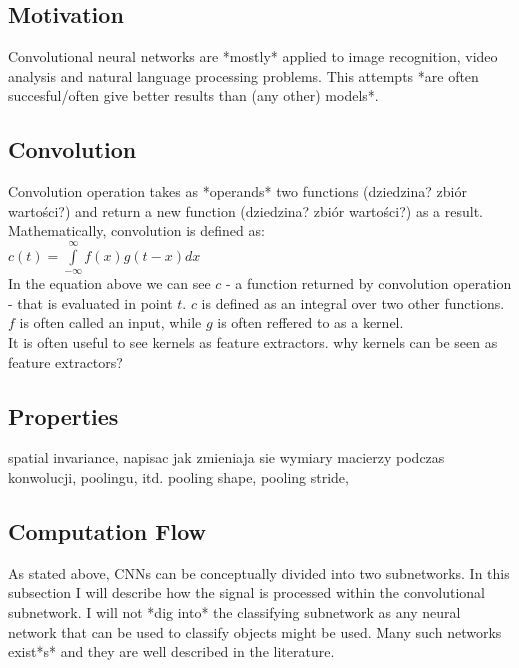 \documentclass[a4paper,10pt]{report}
\begin{document}
      \subsection{Motivation} %
	Convolutional neural networks are *mostly* applied to image recognition, video analysis and natural language processing problems. %
	This attempts *are often succesful/often give better results than (any other) models*. %
	
      \subsection{Convolution} %
	Convolution operation takes as *operands* two functions (dziedzina? zbiór wartości?) and return a new function (dziedzina? zbiór wartości?) as a result. Mathematically, convolution is defined as: \\
	
	$c(t) = \int\limits_{-\infty}^\infty f(x)g(t-x)dx$ \\
	
	In the equation above we can see $c$ - a function returned by convolution operation - that is evaluated in point $t$. $c$ is defined as an integral over two other functions. $f$ is often called an input, while $g$ is often reffered to as a kernel.%
	  \\
	
	
	It is often useful to see kernels as feature extractors. 
	why kernels can be seen as feature extractors?

      \subsection{Properties} %
	spatial invariance, napisac jak zmieniaja sie wymiary macierzy podczas konwolucji, poolingu, itd. pooling shape, pooling stride,
      \subsection{Computation Flow} %
	As stated above, CNNs can be conceptually divided into two subnetworks. In this subsection I will describe how the signal is processed within the convolutional subnetwork. I will not *dig into* the classifying subnetwork as any neural network that can be used to classify objects might be used. Many such networks exist*s* and they are well described in the literature. \\ %
	
\end{document}
